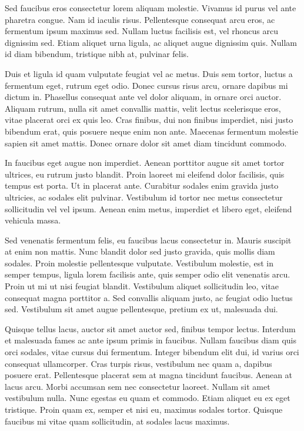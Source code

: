 Sed faucibus eros consectetur lorem aliquam molestie. Vivamus id purus vel ante pharetra congue. Nam id iaculis risus. Pellentesque consequat arcu eros, ac fermentum ipsum maximus sed. Nullam luctus facilisis est, vel rhoncus arcu dignissim sed. Etiam aliquet urna ligula, ac aliquet augue dignissim quis. Nullam id diam bibendum, tristique nibh at, pulvinar felis.

Duis et ligula id quam vulputate feugiat vel ac metus. Duis sem tortor, luctus a fermentum eget, rutrum eget odio. Donec cursus risus arcu, ornare dapibus mi dictum in. Phasellus consequat ante vel dolor aliquam, in ornare orci auctor. Aliquam rutrum, nulla sit amet convallis mattis, velit lectus scelerisque eros, vitae placerat orci ex quis leo. Cras finibus, dui non finibus imperdiet, nisi justo bibendum erat, quis posuere neque enim non ante. Maecenas fermentum molestie sapien sit amet mattis. Donec ornare dolor sit amet diam tincidunt commodo.

In faucibus eget augue non imperdiet. Aenean porttitor augue sit amet tortor ultrices, eu rutrum justo blandit. Proin laoreet mi eleifend dolor facilisis, quis tempus est porta. Ut in placerat ante. Curabitur sodales enim gravida justo ultricies, ac sodales elit pulvinar. Vestibulum id tortor nec metus consectetur sollicitudin vel vel ipsum. Aenean enim metus, imperdiet et libero eget, eleifend vehicula massa.

Sed venenatis fermentum felis, eu faucibus lacus consectetur in. Mauris suscipit at enim non mattis. Nunc blandit dolor sed justo gravida, quis mollis diam sodales. Proin molestie pellentesque vulputate. Vestibulum molestie, est in semper tempus, ligula lorem facilisis ante, quis semper odio elit venenatis arcu. Proin ut mi ut nisi feugiat blandit. Vestibulum aliquet sollicitudin leo, vitae consequat magna porttitor a. Sed convallis aliquam justo, ac feugiat odio luctus sed. Vestibulum sit amet augue pellentesque, pretium ex ut, malesuada dui.

Quisque tellus lacus, auctor sit amet auctor sed, finibus tempor lectus. Interdum et malesuada fames ac ante ipsum primis in faucibus. Nullam faucibus diam quis orci sodales, vitae cursus dui fermentum. Integer bibendum elit dui, id varius orci consequat ullamcorper. Cras turpis risus, vestibulum nec quam a, dapibus posuere erat. Pellentesque placerat sem at magna tincidunt faucibus. Aenean at lacus arcu. Morbi accumsan sem nec consectetur laoreet. Nullam sit amet vestibulum nulla. Nunc egestas eu quam et commodo. Etiam aliquet eu ex eget tristique. Proin quam ex, semper et nisi eu, maximus sodales tortor. Quisque faucibus mi vitae quam sollicitudin, at sodales lacus maximus.

